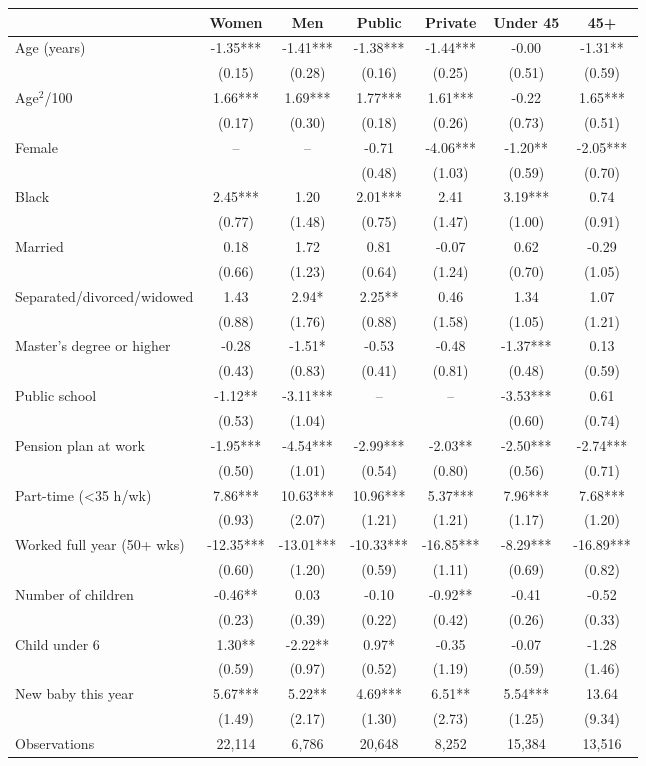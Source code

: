 \begin{tabular}{lcccccc}
\toprule
 & Women & Men & Public & Private & Under 45 & 45+ \\
\midrule
Age (years) & -1.35*** & -1.41*** & -1.38*** & -1.44*** & -0.00 & -1.31** \\
 & (0.15) & (0.28) & (0.16) & (0.25) & (0.51) & (0.59) \\
Age$^2$/100 & 1.66*** & 1.69*** & 1.77*** & 1.61*** & -0.22 & 1.65*** \\
 & (0.17) & (0.30) & (0.18) & (0.26) & (0.73) & (0.51) \\
Female & -- & -- & -0.71 & -4.06*** & -1.20** & -2.05*** \\
 &  &  & (0.48) & (1.03) & (0.59) & (0.70) \\
Black & 2.45*** & 1.20 & 2.01*** & 2.41 & 3.19*** & 0.74 \\
 & (0.77) & (1.48) & (0.75) & (1.47) & (1.00) & (0.91) \\
Married & 0.18 & 1.72 & 0.81 & -0.07 & 0.62 & -0.29 \\
 & (0.66) & (1.23) & (0.64) & (1.24) & (0.70) & (1.05) \\
Separated/divorced/widowed & 1.43 & 2.94* & 2.25** & 0.46 & 1.34 & 1.07 \\
 & (0.88) & (1.76) & (0.88) & (1.58) & (1.05) & (1.21) \\
Master's degree or higher & -0.28 & -1.51* & -0.53 & -0.48 & -1.37*** & 0.13 \\
 & (0.43) & (0.83) & (0.41) & (0.81) & (0.48) & (0.59) \\
Public school & -1.12** & -3.11*** & -- & -- & -3.53*** & 0.61 \\
 & (0.53) & (1.04) &  &  & (0.60) & (0.74) \\
Pension plan at work & -1.95*** & -4.54*** & -2.99*** & -2.03** & -2.50*** & -2.74*** \\
 & (0.50) & (1.01) & (0.54) & (0.80) & (0.56) & (0.71) \\
Part-time (<35 h/wk) & 7.86*** & 10.63*** & 10.96*** & 5.37*** & 7.96*** & 7.68*** \\
 & (0.93) & (2.07) & (1.21) & (1.21) & (1.17) & (1.20) \\
Worked full year (50+ wks) & -12.35*** & -13.01*** & -10.33*** & -16.85*** & -8.29*** & -16.89*** \\
 & (0.60) & (1.20) & (0.59) & (1.11) & (0.69) & (0.82) \\
Number of children & -0.46** & 0.03 & -0.10 & -0.92** & -0.41 & -0.52 \\
 & (0.23) & (0.39) & (0.22) & (0.42) & (0.26) & (0.33) \\
Child under 6 & 1.30** & -2.22** & 0.97* & -0.35 & -0.07 & -1.28 \\
 & (0.59) & (0.97) & (0.52) & (1.19) & (0.59) & (1.46) \\
New baby this year & 5.67*** & 5.22** & 4.69*** & 6.51** & 5.54*** & 13.64 \\
 & (1.49) & (2.17) & (1.30) & (2.73) & (1.25) & (9.34) \\
\midrule
Observations & 22,114 & 6,786 & 20,648 & 8,252 & 15,384 & 13,516 \\
\bottomrule
\end{tabular}
